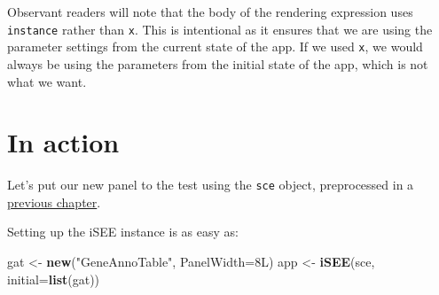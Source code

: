 \documentclass[]{book}
\newenvironment{Shaded}{\begin{snugshade}}{\end{snugshade}}
\newcommand{\KeywordTok}[1]{\textcolor[rgb]{0.13,0.29,0.53}{\textbf{#1}}}
\newcommand{\DataTypeTok}[1]{\textcolor[rgb]{0.13,0.29,0.53}{#1}}
\newcommand{\StringTok}[1]{\textcolor[rgb]{0.31,0.60,0.02}{#1}}
\newcommand{\OperatorTok}[1]{\textcolor[rgb]{0.81,0.36,0.00}{\textbf{#1}}}
\newcommand{\NormalTok}[1]{#1}
\begin{document}
\begin{Shaded}
\end{Shaded}

Observant readers will note that the body of the rendering expression
uses \texttt{instance} rather than \texttt{x}. This is intentional as it
ensures that we are using the parameter settings from the current state
of the app. If we used \texttt{x}, we would always be using the
parameters from the initial state of the app, which is not what we want.

\section{In action}\label{in-action-2}

Let's put our new panel to the test using the \texttt{sce} object,
preprocessed in a \protect\hyperlink{developing}{previous chapter}.

Setting up the iSEE instance is as easy as:

\begin{Shaded}
\begin{Highlighting}[]
\NormalTok{gat <-}\StringTok{ }\KeywordTok{new}\NormalTok{(}\StringTok{"GeneAnnoTable"}\NormalTok{, }\DataTypeTok{PanelWidth=}\NormalTok{8L)}
\NormalTok{app <-}\StringTok{ }\KeywordTok{iSEE}\NormalTok{(sce, }\DataTypeTok{initial=}\KeywordTok{list}\NormalTok{(gat))}
\end{Highlighting}
\end{Shaded}
\end{document}

